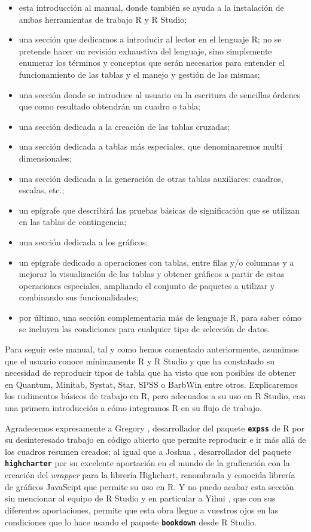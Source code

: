 \documentclass[
]{book}
\providecommand{\tightlist}{%
  \setlength{\itemsep}{0pt}\setlength{\parskip}{0pt}}
\begin{document}
\begin{itemize}
\tightlist
\item
  esta introducción al manual, donde también se ayuda a la instalación de ambas herramientas de trabajo R y R Studio;
\item
  una sección que dedicamos a introducir al lector en el lenguaje R; no se pretende hacer un revisión exhaustiva del lenguaje, sino simplemente enumerar los términos y conceptos que serán necesarios para entender el funcionamiento de las tablas y el manejo y gestión de las mismas;
\item
  una sección donde se introduce al usuario en la escritura de sencillas órdenes que como resultado obtendrán un cuadro o tabla;
\item
  una sección dedicada a la creación de las tablas cruzadas;
\item
  una sección dedicada a tablas más especiales, que denominaremos multi dimensionales;
\item
  una sección dedicada a la generación de otras tablas auxiliares: cuadros, escalas, etc.;
\item
  un epígrafe que describirá las pruebas básicas de significación que se utilizan en las tablas de contingencia;
\item
  una sección dedicada a los gráficos;
\item
  un epígrafe dedicado a operaciones con tablas, entre filas y/o columnas y a mejorar la visualización de las tablas y obtener gráficos a partir de estas operaciones especiales, ampliando el conjunto de paquetes a utilizar y combinando sus funcionalidades;
\item
  por último, una sección complementaria más de lenguaje R, para saber cómo se incluyen las condiciones para cualquier tipo de selección de datos.
\end{itemize}

Para seguir este manual, tal y como hemos comentado anteriormente, asumimos que el usuario conoce mínimamente R y R Studio y que ha constatado su necesidad de reproducir tipos de tabla que ha visto que son posibles de obtener en Quantum, Minitab, Systat, Star, SPSS o BarbWin entre otros. Explicaremos los rudimentos básicos de trabajo en R, pero adecuados a su uso en R Studio, con una primera introducción a cómo integramos R en su flujo de trabajo.

Agradecemos expresamente a Gregory \citet{expss}, desarrollador del paquete \textbf{\texttt{expss}} de R por su desinteresado trabajo en código abierto que permite reproducir e ir más allá de los cuadros resumen creados; al igual que a Joshua \citet{highcharter}, desarrollador del paquete \textbf{\texttt{highcharter}} por su excelente aportación en el mundo de la graficación con la creación del \emph{wrapper} para la librería Highchart, renombrada y conocida librería de gráficos JavaScipt que permite su uso en R. Y no puedo acabar esta sección sin mencionar al equipo de R Studio y en particular a Yihui \citet{bookdown}, que con sus diferentes aportaciones, permite que esta obra llegue a vuestros ojos en las condiciones que lo hace usando el paquete \textbf{\texttt{bookdown}} desde R Studio.
\end{document}
